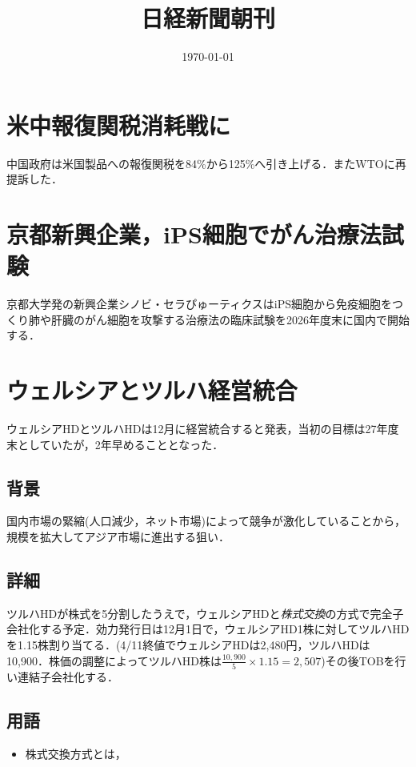 \documentclass{ltjsarticle}
\title{日経新聞朝刊}
\author{}
\date{\today}
\begin{document}
\maketitle

\section{米中報復関税消耗戦に}

中国政府は米国製品への報復関税を84\%から125\%へ引き上げる．またWTOに再提訴した．

\section{京都新興企業，iPS細胞でがん治療法試験}

京都大学発の新興企業シノビ・セラぴゅーティクスはiPS細胞から免疫細胞をつくり肺や肝臓のがん細胞を攻撃する治療法の臨床試験を2026年度末に国内で開始する．

\section{ウェルシアとツルハ経営統合}

ウェルシアHDとツルハHDは12月に経営統合すると発表，当初の目標は27年度末としていたが，2年早めることとなった．

\subsection{背景}

国内市場の緊縮(人口減少，ネット市場)によって競争が激化していることから，規模を拡大してアジア市場に進出する狙い．

\subsection{詳細}

ツルハHDが株式を5分割したうえで，ウェルシアHDと\emph{株式交換}の方式で完全子会社化する予定．効力発行日は12月1日で，ウェルシアHD1株に対してツルハHDを1.15株割り当てる．(4/11終値でウェルシアHDは2,480円，ツルハHDは10,900．株価の調整によってツルハHD株は$\frac{10,900}{5}\times 1.15 = 2,507$)その後TOBを行い連結子会社化する．

\subsection{用語}

\begin{itemize}
  \item 株式交換方式とは，
\end{itemize}
\end{document}
